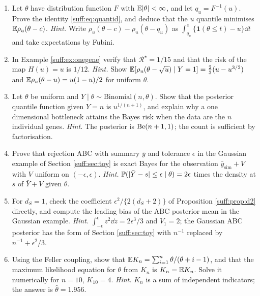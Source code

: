 \begin{enumerate}[label=\arabic*.,ref=\arabic*,leftmargin=2em,itemsep=4pt]
\item \label{suff:ex:quantid}
Let $\theta$ have distribution function $F$ with $\mathbb{E}|\theta|<\infty$, and let
$q_u=F^{-1}(u)$. Prove the identity \eqref{suff:eq:quantid}, and deduce that the $u$ quantile
minimises $\mathbb{E}\rho_u(\theta-c)$.
\emph{Hint.} Write $\rho_u(\theta-c)-\rho_u(\theta-q_u)$ as
$\int_{q_u}^{c}\{\mathbf 1(\theta\le t)-u\}\dd t$ and take expectations by Fubini.

\item In Example \ref{suff:ex:onegene} verify that $\mathcal{R}^\star=1/15$ and that the risk
of the map $H(u)=u$ is $1/12$.
\emph{Hint.} Show $\mathbb{E}[\rho_u(\theta-\sqrt u)\mid Y=1]=\tfrac23(u-u^{3/2})$ and
$\mathbb{E}\rho_u(\theta-u)=u(1-u)/2$ for uniform $\theta$.

\item \label{suff:ex:binom}
Let $\theta$ be uniform and $Y\mid\theta\sim\mathrm{Binomial}(n,\theta)$. Show that the
posterior quantile function given $Y=n$ is $u^{1/(n+1)}$, and explain why a one dimensional
bottleneck attains the Bayes risk when the data are the $n$ individual genes.
\emph{Hint.} The posterior is $\mathrm{Be}(n+1,1)$; the count is sufficient by factorisation.

\item Prove that rejection ABC with summary $\bar y$ and tolerance $\epsilon$ in the Gaussian
example of Section \ref{suff:sec:toy} is exact Bayes for the observation
$\bar y_{\mathrm{sim}}+V$ with $V$ uniform on $(-\epsilon,\epsilon)$.
\label{suff:ex:uniformnoise}
\emph{Hint.} $\mathbb{P}(|\bar Y-s|\le\epsilon\mid\theta)=2\epsilon$ times the density at $s$ of
$\bar Y+V$ given $\theta$.

\item For $d_S=1$, check the coefficient $\epsilon^2/\{2(d_S+2)\}$ of Proposition
\ref{suff:prop:d2} directly, and compute the leading bias of the ABC posterior mean in the
Gaussian example.
\emph{Hint.} $\int_{-\epsilon}^{\epsilon}z^2\dd z=2\epsilon^3/3$ and $V_1=2$; the Gaussian
ABC posterior has the form of Section \ref{suff:sec:toy} with $n^{-1}$ replaced by
$n^{-1}+\epsilon^2/3$.

\item Using the Feller coupling, show that $\mathbb{E} K_n=\sum_{i=1}^{n}\theta/(\theta+i-1)$, and that
the maximum likelihood equation for $\theta$ from $K_n$ is $K_n=\mathbb{E} K_n$. Solve it numerically
for $n=10$, $K_{10}=4$.
\emph{Hint.} $K_n$ is a sum of independent indicators; the answer is $\hat\theta=1.956$.


\end{enumerate}
